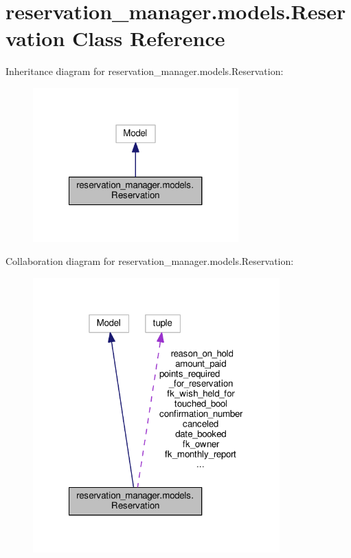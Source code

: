 \hypertarget{classreservation__manager_1_1models_1_1Reservation}{\section{reservation\-\_\-manager.\-models.\-Reservation Class Reference}
\label{classreservation__manager_1_1models_1_1Reservation}
}


Inheritance diagram for reservation\-\_\-manager.\-models.\-Reservation\-:
\nopagebreak
\begin{figure}[H]
\begin{center}
\leavevmode
\includegraphics[width=224pt]{classreservation__manager_1_1models_1_1Reservation__inherit__graph}
\end{center}
\end{figure}


Collaboration diagram for reservation\-\_\-manager.\-models.\-Reservation\-:
\nopagebreak
\begin{figure}[H]
\begin{center}
\leavevmode
\includegraphics[width=269pt]{classreservation__manager_1_1models_1_1Reservation__coll__graph}
\end{center}
\end{figure}
